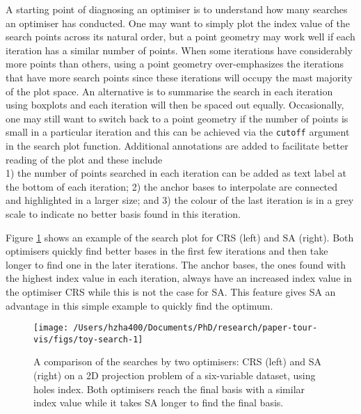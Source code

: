 A starting point of diagnosing an optimiser is to understand how many
searches an optimiser has conducted. One may want to simply plot the
index value of the search points across its natural order, but a point
geometry may work well if each iteration has a similar number of points.
When some iterations have considerably more points than others, using a
point geometry over-emphasizes the iterations that have more search
points since these iterations will occupy the mast majority of the plot
space. An alternative is to summarise the search in each iteration using
boxplots and each iteration will then be spaced out equally.
Occasionally, one may still want to switch back to a point geometry if
the number of points is small in a particular iteration and this can be
achieved via the \texttt{cutoff} argument in the search plot function.
Additional annotations are added to facilitate better reading of the
plot and these include\\
1) the number of points searched in each iteration can be added as text
label at the bottom of each iteration; 2) the anchor bases to
interpolate are connected and highlighted in a larger size; and 3) the
colour of the last iteration is in a grey scale to indicate no better
basis found in this iteration.

Figure \ref{fig:toy-search} shows an example of the search plot for CRS
(left) and SA (right). Both optimisers quickly find better bases in the
first few iterations and then take longer to find one in the later
iterations. The anchor bases, the ones found with the highest index
value in each iteration, always have an increased index value in the
optimiser CRS while this is not the case for SA. This feature gives SA
an advantage in this simple example to quickly find the optimum.

\begin{Schunk}
\begin{figure}

{\centering \texttt{[image: /Users/hzha400/Documents/PhD/research/paper-tour-vis/figs/toy-search-1]} 

}

\caption[A comparison of the searches by two optimisers]{A comparison of the searches by two optimisers: CRS (left) and SA (right) on a 2D projection problem of a six-variable dataset,  using holes index. Both optimisers reach the final basis with a similar index value while it takes SA longer to find the final basis.}\label{fig:toy-search}
\end{figure}
\end{Schunk}

